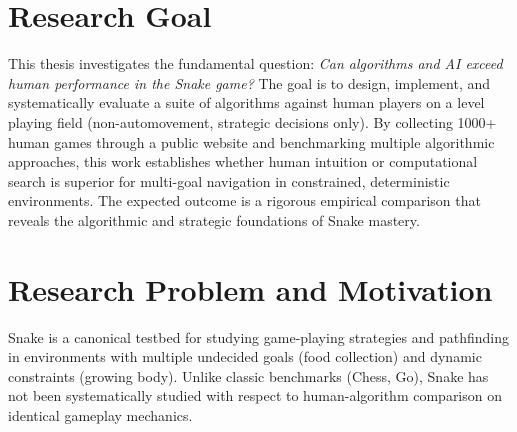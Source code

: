 \documentclass[a4paper]{article}
\title{\docTitle}
\author{Moritz}
\date{\today}
\begin{document}
\maketitle

\begin{abstract}
This proposal outlines a Master's thesis investigating whether computational algorithms can exceed human performance in the classic Snake game. The core contribution is a systematic benchmark comparing human gameplay (1000+ games from 50+ players) with three classical algorithms (A*, Hamiltonian Cycle, Greedy heuristics) and novel algorithms inspired by human strategic patterns. A new replay file format ensures reproducible data capture across all sources. The project addresses a gap in the literature: multi-goal graph navigation in constrained environments, with implications for game AI, pathfinding, and strategic decision-making. Expected deliverables include a public dataset, comprehensive empirical comparison, and novel algorithmic insights into human-level performance in Snake.
\end{abstract}

\section{Research Goal}

This thesis investigates the fundamental question: \textit{Can algorithms and AI exceed human performance in the Snake game?} The goal is to design, implement, and systematically evaluate a suite of algorithms against human players on a level playing field (non-automovement, strategic decisions only). By collecting 1000+ human games through a public website and benchmarking multiple algorithmic approaches, this work establishes whether human intuition or computational search is superior for multi-goal navigation in constrained, deterministic environments. The expected outcome is a rigorous empirical comparison that reveals the algorithmic and strategic foundations of Snake mastery.

\section{Research Problem and Motivation}

Snake is a canonical testbed for studying game-playing strategies and pathfinding in environments with multiple undecided goals (food collection) and dynamic constraints (growing body). Unlike classic benchmarks (Chess, Go), Snake has not been systematically studied with respect to human-algorithm comparison on identical gameplay mechanics.
\end{document}
